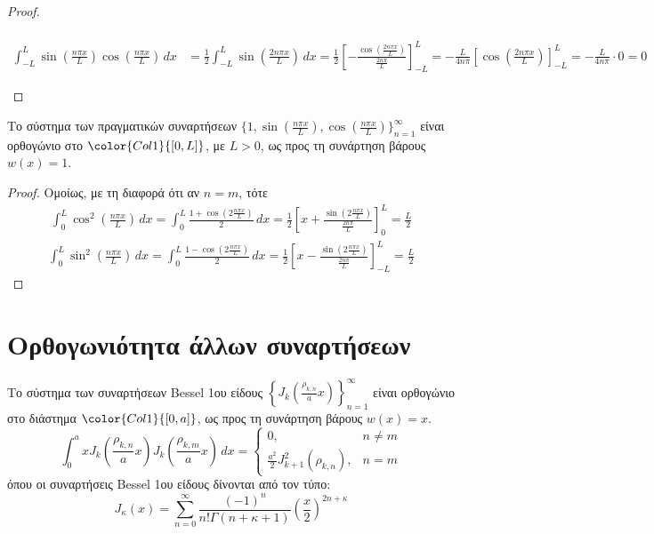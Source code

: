\begin{proof}
\begin{myitemize}
\begin{align*}
      \end{align*}
      \begin{align*}
        \int _{-L}^{L} \sin{\left(\frac{n \pi x }{L}\right)} 
        \cos{\left(\frac{n \pi x}{L}\right)} \,{dx} 
            &= \frac{1}{2} \int _{-L}^{L} \sin{\left(\frac{2 n \pi x}{L}\right)} \,{dx} 
            = \frac{1}{2} \left[-\frac{\cos{\left(\frac{2 n \pi x}{L}\right)}}
            {\frac{2n \pi}{L}} \right]_{-L}^{L} 
            = -\frac{L}{4 n \pi} \left[\cos{\left(\frac{2n \pi x}{L}\right)} 
            \right]_{-L}^{L} = -\frac{L}{4n\pi}\cdot 0 = 0
      \end{align*}
  \end{myitemize}
\end{proof}
\begin{prop}
  Το σύστημα των πραγματικών συναρτήσεων 
  $ \{ 1, \sin{\left(\frac{n \pi x}{L}\right)}, 
  \cos{\left(\frac{n \pi x}{L}\right)} \}_{n=1}^{\infty} $ 
  είναι ορθογώνιο στο $ \color{Col1}{[0,L]} $, με $ L>0 $, ως προς τη συνάρτηση βάρους 
  $ w(x)=1 $.
\end{prop}
\begin{proof}
  Ομοίως, με τη διαφορά ότι αν $ n=m $, τότε 
  \begin{align*}
    \int _{0}^{L} \cos^{2}\left(\frac{n \pi x}{L}\right) \,{dx} = 
    \int _{0}^{L} \frac{1+ \cos{\left( 2 \frac{n \pi x}{L} \right)}}{2}
    \,{dx} = 
    \frac{1}{2} \left[x + \frac{\sin{\left(2 \frac{n \pi x}{L}\right)}}
    {\frac{2 n \pi}{L}} \right]_{0}^{L} = \frac{L}{2}
  \end{align*}
  \begin{align*}
    \int _{0}^{L} \sin^{2}\left(\frac{n \pi x}{L}\right) \,{dx} = 
    \int _{0}^{L} \frac{1- \cos{\left( 2 \frac{n \pi x}{L} \right)}}{2}
    \,{dx} = 
    \frac{1}{2} \left[x - \frac{\sin{\left(2 \frac{n \pi x}{L}\right)}}
    {\frac{2 n \pi}{L}} \right]_{-L}^{L} = \frac{L}{2}
  \end{align*}
\end{proof}

\section*{Ορθογωνιότητα άλλων συναρτήσεων}

\begin{prop}
  Το σύστημα των συναρτήσεων Bessel 1ου είδους 
  $ \left\{ J_{k}\left(\frac{\rho _{k,n}}{a}x \right)\right\}_{n=1}^{\infty} $ 
  είναι ορθογώνιο στο διάστημα $ \color{Col1}{[0,a]} $, ως προς τη συνάρτηση βάρους 
  $ w(x)=x $.
  \[
    \int _{0}^{a} x J_{k}\left(\frac{\rho _{k,n}}{a}x \right)
    J_{k}\left(\frac{\rho_{k,m}}{a}x\right) \,{dx} = 
    \begin{cases}
      0, & n \neq m \\
      \frac{a^{2}}{2} J_{k+1}^{2}(\rho_{k,n}), & n=m
    \end{cases}
   \] 
  όπου οι συναρτήσεις Bessel 1ου είδους δίνονται από τον τύπο:
  \[
    J_{\kappa}(x) = \sum_{n=0}^{\infty} \frac{(-1)^{n}}{n!
    \Gamma(n+\kappa+1)}\left(\frac{x}{2}\right)^{2n+\kappa} 
  \]
\end{prop}

